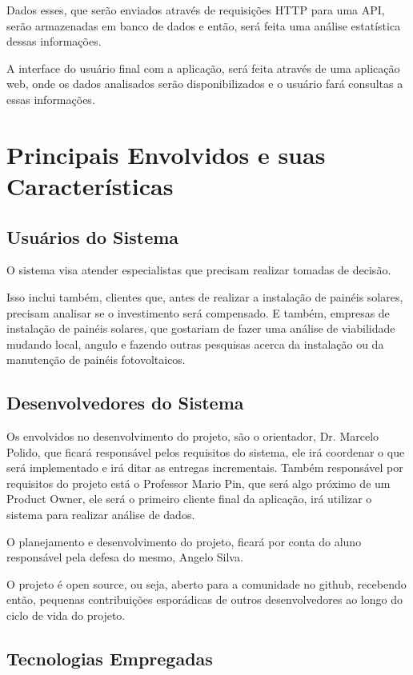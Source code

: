 Dados esses, que serão enviados através de requisições HTTP para uma API, serão armazenadas em banco de dados e então, será feita uma análise estatística dessas informações.

A interface do usuário final com a aplicação, será feita através de uma aplicação web, onde os dados analisados serão disponibilizados e o usuário fará consultas a essas informações.

\section{Principais Envolvidos e suas Características}

\subsection{Usuários do Sistema}

O sistema visa atender especialistas que precisam realizar tomadas de decisão.

Isso inclui também, clientes que, antes de realizar a instalação de painéis solares, precisam analisar se o investimento será compensado. E também, empresas de instalação de painéis solares, que gostariam de fazer uma análise de viabilidade mudando local, angulo e fazendo outras pesquisas acerca da instalação ou da manutenção de painéis fotovoltaicos.

\subsection{Desenvolvedores do Sistema}

Os envolvidos no desenvolvimento do projeto, são o orientador, Dr. Marcelo Polido, que ficará responsável pelos requisitos do sistema, ele irá coordenar o que será implementado e irá ditar as entregas incrementais. Também responsável por requisitos do projeto está o Professor Mario Pin, que será algo próximo de um Product Owner, ele será o primeiro cliente final da aplicação, irá utilizar o sistema para realizar análise de dados.

O planejamento e desenvolvimento do projeto, ficará por conta do aluno responsável pela defesa do mesmo, Angelo Silva.

O projeto é open source, ou seja, aberto para a comunidade no github, recebendo então, pequenas contribuições esporádicas de outros desenvolvedores ao longo do ciclo de vida do projeto.

\subsection{Tecnologias Empregadas}

